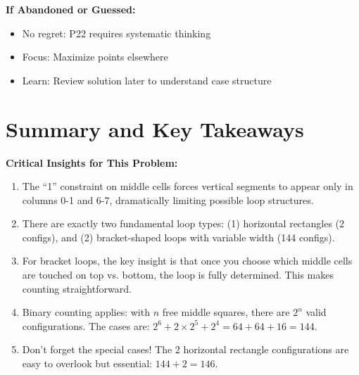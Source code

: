 \documentclass[12pt]{article}
\begin{document}
\begin{competitionbox}
\textbf{If Abandoned or Guessed:}
\begin{itemize}
    \item No regret: P22 requires systematic thinking
    \item Focus: Maximize points elsewhere
    \item Learn: Review solution later to understand case structure
\end{itemize}

\end{competitionbox}

\section{Summary and Key Takeaways}

\begin{keyinsight}
\textbf{Critical Insights for This Problem:}

\begin{enumerate}
    \item The ``1'' constraint on middle cells forces vertical segments to appear only in columns 0-1 and 6-7, dramatically limiting possible loop structures.
    
    \item There are exactly two fundamental loop types: (1) horizontal rectangles (2 configs), and (2) bracket-shaped loops with variable width (144 configs).
    
    \item For bracket loops, the key insight is that once you choose which middle cells are touched on top vs. bottom, the loop is fully determined. This makes counting straightforward.
    
    \item Binary counting applies: with $n$ free middle squares, there are $2^n$ valid configurations. The cases are: $2^6 + 2 \times 2^5 + 2^4 = 64 + 64 + 16 = 144$.
    
    \item Don't forget the special cases! The 2 horizontal rectangle configurations are easy to overlook but essential: $144 + 2 = 146$.
\end{enumerate}
\end{keyinsight}
\end{document}
